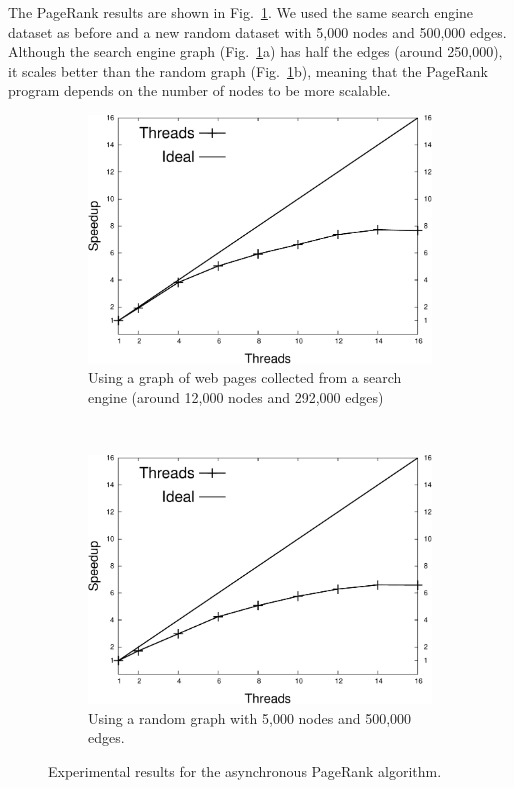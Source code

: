 The PageRank results are shown in Fig.~\ref{exp:pagerank}. We used the same search engine dataset as before and a new random dataset with 5,000 nodes and 500,000 edges. Although the search engine graph (Fig.~\ref{exp:pagerank}a) has half the edges (around 250,000), it scales better than the random graph (Fig.~\ref{exp:pagerank}b), meaning that the PageRank program depends on the number of nodes to be more scalable.

\begin{figure}[h]
   \vspace{-0.1\intextsep}
   \centering
   \begin{subfigure}[b]{\plotsize}
      \includegraphics[width=\textwidth]{speedup_pagerank-search_engines.pdf}
      \caption{Using a graph of web pages collected from a search engine (around 12,000 nodes and 292,000 edges)}
   \end{subfigure}
   ~~~~
   \begin{subfigure}[b]{\plotsize}
      \includegraphics[width=\textwidth]{speedup_pagerank-5000.pdf}
      \caption{Using a random graph with 5,000 nodes and 500,000 edges.\newline}
   \end{subfigure}
   \caption{Experimental results for the asynchronous PageRank algorithm.}
   \label{exp:pagerank}
   \vspace{-0.8\intextsep}
\end{figure}

